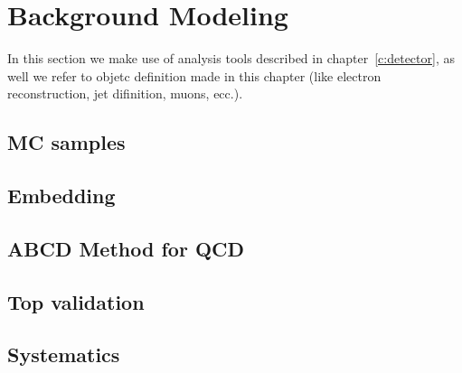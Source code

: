 \section{Background Modeling}
In this section we make use of analysis tools described in chapter~\ref{c:detector}, as well
we refer to objetc definition made in this chapter (like electron reconstruction, jet difinition, muons, ecc.).

\subsection{MC samples}
\subsection{Embedding}
\subsection{ABCD Method for QCD}
\subsection{Top validation}
\subsection{Systematics}


